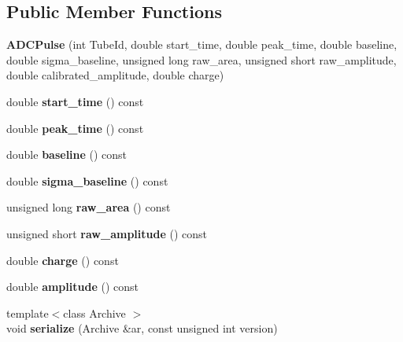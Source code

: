 \subsection*{Public Member Functions}
\begin{DoxyCompactItemize}
\item 
\hypertarget{classADCPulse_a98b82ea9459a5fca7947a855fb8c7405}{{\bfseries A\-D\-C\-Pulse} (int Tube\-Id, double start\-\_\-time, double peak\-\_\-time, double baseline, double sigma\-\_\-baseline, unsigned long raw\-\_\-area, unsigned short raw\-\_\-amplitude, double calibrated\-\_\-amplitude, double charge)}\label{classADCPulse_a98b82ea9459a5fca7947a855fb8c7405}

\item 
\hypertarget{classADCPulse_aba2eb2e6400677d592ef1685ba2ae5a9}{double {\bfseries start\-\_\-time} () const }\label{classADCPulse_aba2eb2e6400677d592ef1685ba2ae5a9}

\item 
\hypertarget{classADCPulse_ac55a1faf2cf205fbdc859daece64a021}{double {\bfseries peak\-\_\-time} () const }\label{classADCPulse_ac55a1faf2cf205fbdc859daece64a021}

\item 
\hypertarget{classADCPulse_a4900e0a75c4981491f8609428888a6bc}{double {\bfseries baseline} () const }\label{classADCPulse_a4900e0a75c4981491f8609428888a6bc}

\item 
\hypertarget{classADCPulse_a824ed4ba627f7641ff70adf2fe3b026f}{double {\bfseries sigma\-\_\-baseline} () const }\label{classADCPulse_a824ed4ba627f7641ff70adf2fe3b026f}

\item 
\hypertarget{classADCPulse_a692780da124b59770356393f16299c49}{unsigned long {\bfseries raw\-\_\-area} () const }\label{classADCPulse_a692780da124b59770356393f16299c49}

\item 
\hypertarget{classADCPulse_a7a09c65e5b638c6a2df3e437219f04f8}{unsigned short {\bfseries raw\-\_\-amplitude} () const }\label{classADCPulse_a7a09c65e5b638c6a2df3e437219f04f8}

\item 
\hypertarget{classADCPulse_aad38764b5eabe9d858309bc06cf73424}{double {\bfseries charge} () const }\label{classADCPulse_aad38764b5eabe9d858309bc06cf73424}

\item 
\hypertarget{classADCPulse_adf6f2ab6b4c28e425dd7567a70099826}{double {\bfseries amplitude} () const }\label{classADCPulse_adf6f2ab6b4c28e425dd7567a70099826}

\item 
\hypertarget{classADCPulse_ae2b9e749cbd984bd1aa24dc41e4fbb73}{{\footnotesize template$<$class Archive $>$ }\\void {\bfseries serialize} (Archive \&ar, const unsigned int version)}\label{classADCPulse_ae2b9e749cbd984bd1aa24dc41e4fbb73}

\end{DoxyCompactItemize}

